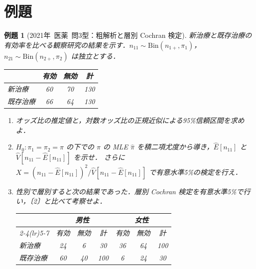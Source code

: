 \documentclass[a4paper,11pt,openany]{ltjsbook}
\newtheorem{reidai}{例題}[chapter]
\newcommand{\kakomon}[2]{\mbox{#1年 医薬 問#2}}
\newcommand{\Bin}{\mathrm{Bin}}
\begin{document}
\section{例題}\label{sec:m07-reidai}
\begin{reidai}[\kakomon{2021}{3}型：粗解析と層別 Cochran 検定]\label{reidai:m07-1}
新治療と既存治療の有効率を比べる観察研究の結果を示す．$n_{11}\sim\Bin(n_{1+},\pi_1)$，$n_{21}\sim\Bin(n_{2+},\pi_2)$ は独立とする．
\begin{center}\small
\begin{tabular}{@{}lccc@{}}
\toprule
 & 有効 & 無効 & 計\\
\midrule
新治療 & 60 & 70 & 130\\
既存治療 & 66 & 64 & 130\\
\bottomrule
\end{tabular}
\end{center}
\begin{enumerate}[label=〔\arabic*〕]
\item オッズ比の推定値と，対数オッズ比の正規近似による95\%信頼区間を求めよ．
\item $H_0:\pi_1=\pi_2=\pi$ の下での $\pi$ の MLE $\hat\pi$ を積二項尤度から導き，$\hat E[n_{11}]$ と $\hat V[n_{11}-\hat E[n_{11}]]$ を示せ．
      さらに $X=(n_{11}-\hat E[n_{11}])^2/\hat V[n_{11}-\hat E[n_{11}]]$ で有意水準5\%の検定を行え．
\item 性別で層別すると次の結果であった．層別 Cochran 検定を有意水準5\%で行い，〔2〕と比べて考察せよ．
\begin{center}\small
\begin{tabular}{@{}lcccccc@{}}
\toprule
 & \multicolumn{3}{c}{男性} & \multicolumn{3}{c}{女性}\\
\cmidrule(lr){2-4}\cmidrule(lr){5-7}
 & 有効 & 無効 & 計 & 有効 & 無効 & 計\\
\midrule
新治療 & 24 & 6 & 30 & 36 & 64 & 100\\
既存治療 & 60 & 40 & 100 & 6 & 24 & 30\\
\bottomrule
\end{tabular}
\end{center}
\end{enumerate}
\end{reidai}
\end{document}
